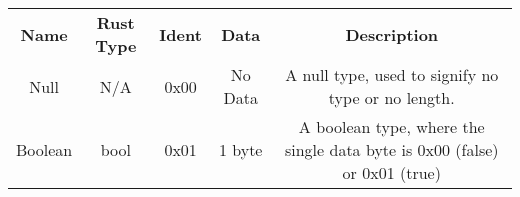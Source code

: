 \documentclass{report}
\begin{document}
\begin{center}
\begin{tabular}{| c | c | c | c | c |}
\textbf{Name} & \textbf{Rust Type} & \textbf{Ident} & \textbf{Data} & \textbf{Description} \\

Null & N/A & 0x00 & No Data & A null type, used to signify no type or no length. \\

Boolean & bool & 0x01 & 1 byte & A boolean type, where the single data byte is 0x00 (false) or 0x01 (true) \\


\end{tabular}
\end{center}
\end{document}
